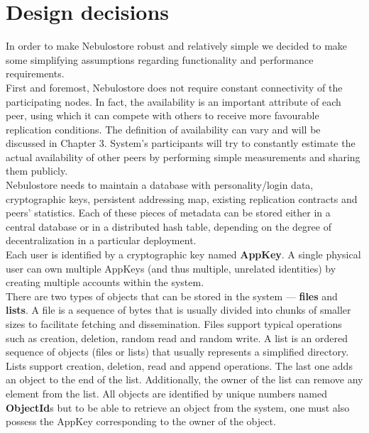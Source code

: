 \documentclass{pracamgren}
\begin{document}
\section{Design decisions}

In order to make Nebulostore robust and relatively simple we decided to make some simplifying assumptions regarding functionality and performance requirements.\\

First and foremost, Nebulostore does not require constant connectivity of the participating nodes. In fact, the availability is an important attribute of each peer, using which it can compete with others to receive more favourable replication conditions. The definition of availability can vary and will be discussed in Chapter 3. System's participants will try to constantly estimate the actual availability of other peers by performing simple measurements and sharing them publicly.\\

Nebulostore needs to maintain a database with personality/login data, cryptographic keys, persistent addressing map, existing replication contracts and peers' statistics. Each of these pieces of metadata can be stored either in a central database or in a distributed hash table, depending on the degree of decentralization in a particular deployment.\\

Each user is identified by a cryptographic key named {\bf AppKey}. A single physical user can own multiple AppKeys (and thus multiple, unrelated identities) by creating multiple accounts within the system.\\

There are two types of objects that can be stored in the system --- {\bf files} and {\bf lists}. A file is a sequence of bytes that is usually divided into chunks of smaller sizes to facilitate fetching and dissemination. Files support typical operations such as creation, deletion, random read and random write. A list is an ordered sequence of objects (files or lists) that usually represents a simplified directory. Lists support creation, deletion, read and append operations. The last one adds an object to the end of the list. Additionally, the owner of the list can remove any element from the list. All objects are identified by unique numbers named {\bf ObjectId}s but to be able to retrieve an object from the system, one must also possess the AppKey corresponding to the owner of the object.\\
\end{document}
